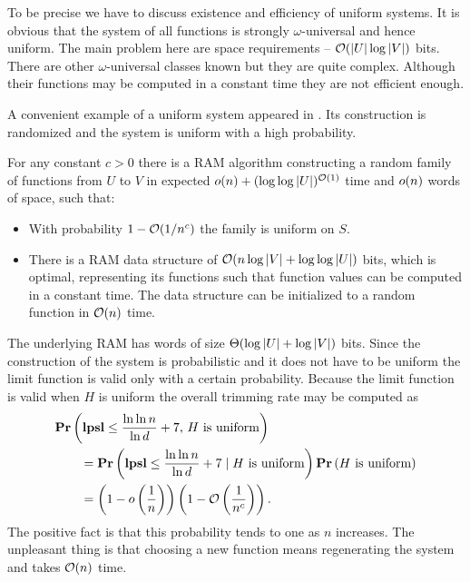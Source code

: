 To be precise we have to discuss existence and efficiency of uniform systems. It is obvious that the system of all functions is strongly $\omega$-universal and hence uniform. The main problem here are space requirements -- $\mathcal{O}(|U| \log |V|)$ bits. There are other $\omega$-universal classes known but they are quite complex. Although their functions may be computed in a constant time they are not efficient enough. 

A convenient example of a uniform system appeared in \cite{DBLP:journals/siamcomp/PaghP08}. Its construction is randomized and the system is uniform with a high probability.
\begin{theorem}
\label{theorem-uniform-system}
For any constant $c > 0$ there is a RAM algorithm constructing a random family of functions from $U$ to $V$ in expected $o(n) + (\log \log|U|)^{\mathcal{O}(1)}$ time and $o(n)$ words of space, such that:
\begin{itemize}
\item With probability $1 - \mathcal{O}(1 / n^c)$ the family is uniform on $S$.
\item There is a RAM data structure of $\mathcal{O}(n \log|V| + \log \log|U|)$ bits, which is optimal, representing its functions such that function values can be computed in a constant time. The data structure can be initialized to a random function in $\mathcal{O}(n)$ time.
\end{itemize}
\end{theorem}

The underlying RAM has words of size $\mathrm{\Theta}(\log |U| + \log |V|)$ bits. Since the construction of the system is probabilistic and it does not have to be uniform the limit function is valid only with a certain probability. Because the limit function is valid when $H$ is uniform the overall trimming rate may be computed as
\[
\begin{split} 
& \mathbf{Pr}\left(\mathbf{lpsl} \leq \frac{\ln \ln n}{\ln d} + 7,\, H \mbox{ is uniform}\right) \\
	& \qquad = \mathbf{Pr}\left(\mathbf{lpsl} \leq \frac{\ln \ln n}{\ln d} + 7 \mid H \mbox{ is uniform}\right) \mathbf{Pr}\left(H \mbox{ is uniform}\right) \\ 
	& \qquad = \left(1 - o\left(\frac{1}{n}\right)\right)\left(1 - \mathcal{O}\left(\frac{1}{n^c}\right)\right). \\
\end{split}
\]
The positive fact is that this probability tends to one as $n$ increases. The unpleasant thing is that choosing a new function means regenerating the system and takes $\mathcal{O}(n)$ time.

